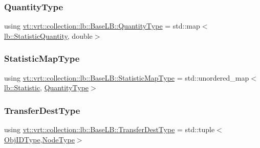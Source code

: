 \subsubsection{\texorpdfstring{Quantity\+Type}{QuantityType}}
{\footnotesize\ttfamily using \hyperlink{structvt_1_1vrt_1_1collection_1_1lb_1_1_base_l_b_a864b2c437d81680577013741e265ef0d}{vt\+::vrt\+::collection\+::lb\+::\+Base\+L\+B\+::\+Quantity\+Type} =  std\+::map$<$\hyperlink{namespacevt_1_1vrt_1_1collection_1_1lb_a74989c7b4dd16fcc067e90a29cd1febe}{lb\+::\+Statistic\+Quantity}, double$>$}

\mbox{\label{structvt_1_1vrt_1_1collection_1_1lb_1_1_base_l_b_acd9bdad961ac83c96b7a227de672f96c}} 
\subsubsection{\texorpdfstring{Statistic\+Map\+Type}{StatisticMapType}}
{\footnotesize\ttfamily using \hyperlink{structvt_1_1vrt_1_1collection_1_1lb_1_1_base_l_b_acd9bdad961ac83c96b7a227de672f96c}{vt\+::vrt\+::collection\+::lb\+::\+Base\+L\+B\+::\+Statistic\+Map\+Type} =  std\+::unordered\+\_\+map$<$\hyperlink{namespacevt_1_1vrt_1_1collection_1_1lb_af0e20ef9afee77295053aa83bf1348b1}{lb\+::\+Statistic}, \hyperlink{structvt_1_1vrt_1_1collection_1_1lb_1_1_base_l_b_a864b2c437d81680577013741e265ef0d}{Quantity\+Type}$>$}

\mbox{\label{structvt_1_1vrt_1_1collection_1_1lb_1_1_base_l_b_add886785f64ea725005f1263fd1393be}} 
\subsubsection{\texorpdfstring{Transfer\+Dest\+Type}{TransferDestType}}
{\footnotesize\ttfamily using \hyperlink{structvt_1_1vrt_1_1collection_1_1lb_1_1_base_l_b_add886785f64ea725005f1263fd1393be}{vt\+::vrt\+::collection\+::lb\+::\+Base\+L\+B\+::\+Transfer\+Dest\+Type} =  std\+::tuple$<$\hyperlink{structvt_1_1vrt_1_1collection_1_1lb_1_1_base_l_b_a790b22acf448880599724749cdc4e9b3}{Obj\+I\+D\+Type},\hyperlink{namespacevt_a866da9d0efc19c0a1ce79e9e492f47e2}{Node\+Type}$>$}

